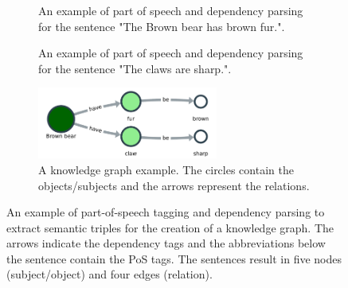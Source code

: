 \documentclass[a4paper, 12pt, oneside]{book} %
\begin{document}
\begin{figure} [h!]
    \centering
    \begin{subfigure}[b]{1.0\textwidth}
        \centering
        
        \caption[Example of part of speech tagging (1)]{An example of part of speech and dependency parsing for the sentence "The Brown bear has brown fur.".}
        \label{fig:PoS_example}
    \end{subfigure}
    \vfill
    \centering
    \begin{subfigure}[b]{1.0\textwidth}
        \centering
        
        \caption[Example of part of speech tagging (2)]{An example of part of speech and dependency parsing for the sentence "The claws are sharp.".}
        \label{fig:PoS_example2}
    \end{subfigure}
    \vfill
    \begin{subfigure}[b]{1.0\textwidth}
        \centering
        \includegraphics[width=0.65\textwidth]{kn_example_v2.pdf}
        \caption[Example of a knowledge graph]{A knowledge graph example. The circles contain the objects/subjects and the arrows represent the relations.}
        \label{fig:graph_example}    
    \end{subfigure}
    \caption[Part of Speech tagging and dependency parsing]{An example of part-of-speech tagging and dependency parsing to extract semantic triples for the creation of a knowledge graph. The arrows indicate the dependency tags and the abbreviations below the sentence contain the PoS tags. The sentences result in five nodes (subject/object) and four edges (relation). }
    \label{fig:pos_pipeline}
\end{figure}
\end{document}
